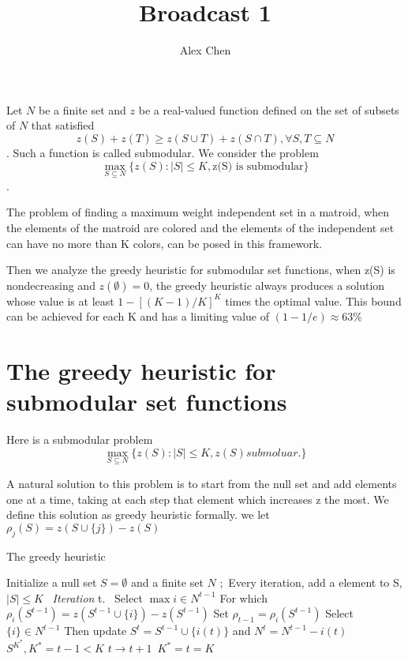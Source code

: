 \documentclass{article}
\title{Broadcast 1}
\author{Alex Chen}
\begin{document}
\maketitle
\abstract
Let $N$ be a finite set and $z$ be a real-valued function defined on the set of subsets of $N$ that satisfied \begin{displaymath}
z(S)+z(T)\geq z(S\cup T)+z(S\cap T), \forall S,T \subseteq N
\end{displaymath}. Such a function is called submodular. We consider the problem  \begin{displaymath} \max_{S\subseteq N} \{ z(S):|S|\leq K, \text{z(S) is submodular} \} \end{displaymath}.
\par The problem of finding a maximum weight independent set in a matroid, when the elements of the matroid are colored and the elements of the independent set can have no more than K colors, can be posed in this framework.
\par Then we analyze the greedy heuristic for submodular set functions, when z(S) is nondecreasing and $z(\emptyset)=0$, the greedy heuristic always produces a solution whose value is at least  $1-[(K-1)/K]^K$ times the optimal value. This bound can be achieved for each K and has a limiting value of $(1-1/e)\approx 63\% $

\section{The greedy heuristic for submodular set functions}
\par Here is a submodular problem
\begin{equation}
\max_{S\subseteq N}\{z(S):|S|\leq K,z(S) submoluar.\}
\label{N1}
\end{equation}
\par A natural solution to this problem is to start from the null set and add elements one at a time, taking at each step that element which increases z the most. We define this solution as greedy heuristic formally. we let $ \rho _j(S)=z(S\cup\{j\})- z(S)$

\begin{algorithm}
        \caption{The greedy heuristic}
\begin{algorithmic}[1]
\STATE Initialize a null set $S=\emptyset$ and a finite set $N$ ;\
\STATE Every iteration, add a element to S, $|S|\leq K$       \
\STATE \emph{Iteration} t.\
    \STATE Select $\max i\in N^{t-1}$
    \STATE For which $\rho_{i}(S^{t-1}) = z(S^{t-1}\cup\{i\})- z(S^{t-1})$
    \STATE Set $\rho_{t-1}=\rho_{i}(S^{t-1})$
\IF{$\rho > 0$}
    \STATE Select$\{i\} \in N^{t-1}$
    \STATE Then update $S^t=S^{t-1}\cup \{i(t)\}$ and $N^t=N^{t-1}-{i(t)}$
\ELSE
    \RETURN $ S^{K^*}, K^*=t-1<K $
\ENDIF
\STATE $t\rightarrow t+1$\
\ENDWHILE $K^*=t=K$
\end{algorithmic}
\end{algorithm}
\end{document}
